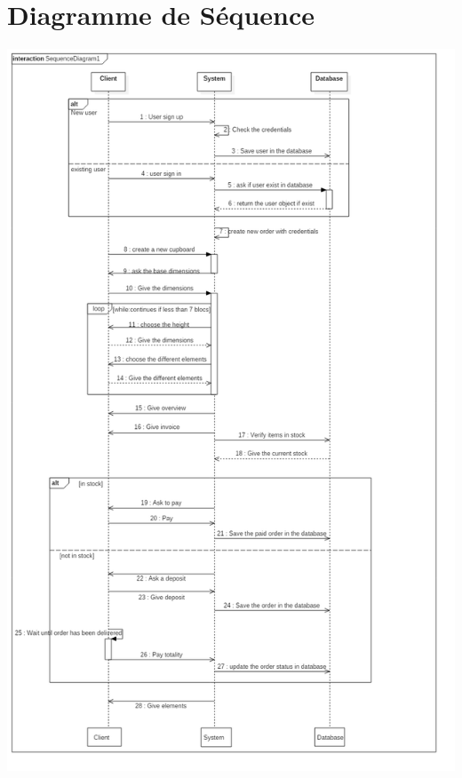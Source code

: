 \documentclass{ecam}
\begin{document}
\section{Diagramme de Séquence}
\begin{center}
\includegraphics[scale=0.4]{../images/sequence-diagram.png}
\end{center}
\end{document}
